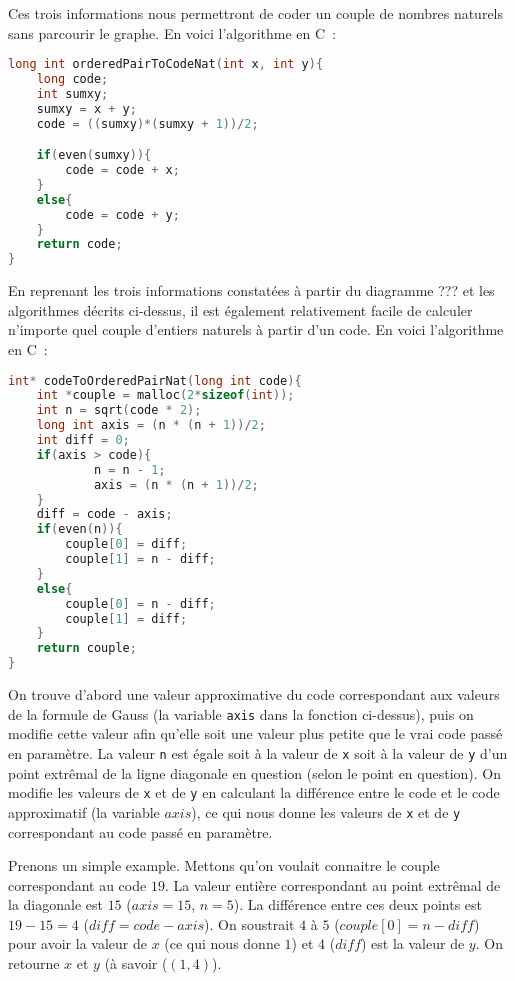 \documentclass{article}
\begin{document}
Ces trois informations nous permettront de coder un couple de nombres naturels sans parcourir le graphe. En voici l'algorithme en C~:

\begin{lstlisting}[language=C]
long int orderedPairToCodeNat(int x, int y){
	long code;
	int sumxy; 
	sumxy = x + y;
	code = ((sumxy)*(sumxy + 1))/2;

	if(even(sumxy)){
		code = code + x;
	}
	else{
		code = code + y; 
	}
	return code;
}
\end{lstlisting}


En reprenant les trois informations constatées à partir du diagramme ??? et les algorithmes décrits ci-dessus, il est également relativement facile de calculer n'importe quel couple d'entiers naturels à partir d'un code. En voici l'algorithme en C~:

\begin{lstlisting}[language=C]
int* codeToOrderedPairNat(long int code){
	int *couple = malloc(2*sizeof(int));
	int n = sqrt(code * 2);
	long int axis = (n * (n + 1))/2;
	int diff = 0;
	if(axis > code){
			n = n - 1;
			axis = (n * (n + 1))/2;
	}
	diff = code - axis;
	if(even(n)){
		couple[0] = diff;
		couple[1] = n - diff;
	}
	else{
		couple[0] = n - diff;
		couple[1] = diff;
	}
	return couple;
}
\end{lstlisting}

On trouve d'abord une valeur approximative du code correspondant aux valeurs de la formule de Gauss (la variable \lstinline!axis! dans la fonction ci-dessus), puis on modifie cette valeur afin qu'elle soit une valeur plus petite que le vrai code passé en paramètre. La valeur \lstinline!n! est égale soit à la valeur de \lstinline!x! soit à la valeur de \lstinline!y! d'un point extrêmal de la ligne diagonale en question (selon le point en question). On modifie les valeurs de \lstinline!x! et de \lstinline!y! en calculant la différence entre le code et le code approximatif (la variable $axis$), ce qui nous donne les valeurs de \lstinline!x! et de \lstinline!y! correspondant au code passé en paramètre.

Prenons un simple example. Mettons qu'on voulait connaitre le couple correspondant au code $19$. La valeur entière  correspondant au point extrêmal de la diagonale est $15$ ($axis = 15$, $n = 5$). La différence entre ces deux points est $19 - 15 = 4$ ($diff = code - axis$). On soustrait $4$ à $5$ ($couple[0] = n - diff$) pour avoir la valeur de $x$ (ce qui nous donne $1$) et $4$ ($diff$) est la valeur de $y$. On retourne $x$ et $y$ (à savoir ($(1,4)$).
\end{document}
